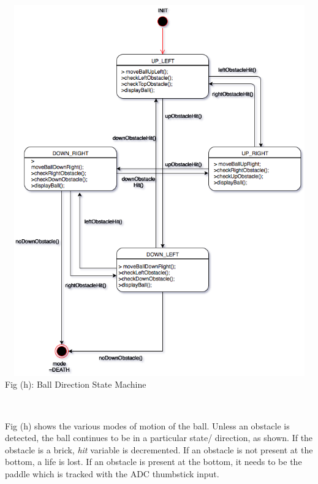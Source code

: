 \documentclass{article}
\begin{document}
\begin{center}
\includegraphics[width=14cm, height=16cm]{Images/ballDirectionStatemachine} \\
\caption{Fig (h): Ball Direction State Machine} \\
\end{center}
\qquad Fig (h) shows the various modes of motion of the ball. Unless an obstacle is detected, the ball continues to be in a particular state/ direction, as shown. If the obstacle is a brick, \textit{hit} variable is decremented. If an obstacle is not present at the bottom, a life is lost. If an obstacle is present at the bottom, it needs to be the paddle which is tracked with the ADC thumbstick input.
\end{document}
